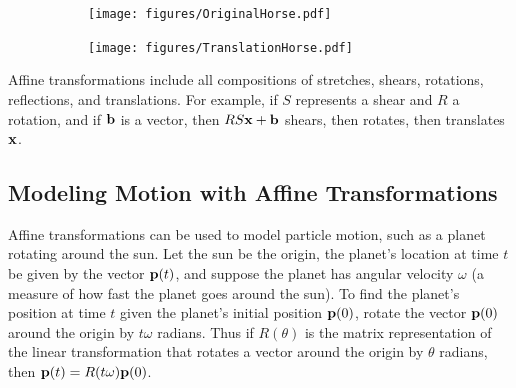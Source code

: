 \begin{figure}[H] %
\captionsetup[subfigure]{justification=centering}
\centering
\begin{subfigure}{.32\textwidth}
    \centering
    \texttt{[image: figures/OriginalHorse.pdf]}
\end{subfigure}%
\begin{subfigure}{.32\textwidth}
    \centering
    \texttt{[image: figures/TranslationHorse.pdf]}
\end{subfigure}
\end{figure}

Affine transformations include all compositions of stretches, shears, rotations, reflections, and translations.
For example, if $S$ represents a shear and $R$ a rotation, and if $\mathbf{b}$ is a vector, then $RS\mathbf{x} + \mathbf{b}$ shears, then rotates, then translates $\mathbf{x}$.

\subsection*{Modeling Motion with Affine Transformations} %

Affine transformations can be used to model particle motion, such as a planet rotating around the sun.
Let the sun be the origin, the planet's location at time $t$ be given by the vector $\mathbf{p}(t)$, and suppose the planet has angular velocity $\omega$ (a measure of how fast the planet goes around the sun).
To find the planet's position at time $t$ given the planet's initial position $\mathbf{p}(0)$, rotate the vector $\mathbf{p}(0)$ around the origin by $t\omega$ radians.
Thus if $R(\theta)$ is the matrix representation of the linear transformation that rotates a vector around the origin by $\theta$ radians, then $\mathbf{p}(t) = R(t\omega)\mathbf{p}(0)$.

\begin{center}
\end{center}

